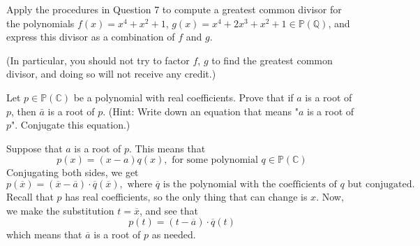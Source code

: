 \documentclass{article}
\theoremstyle{plain} %
\numberwithin{thm}{section} %
\theoremstyle{definition}
\begin{document}
    \newpage
    \begin{question}{8}
        Apply the procedures in Question 7 to compute a greatest common divisor for the polynomials
        \(f(x) = x^4 + x^2 + 1\), \(g(x) = x^4 + 2x^3 + x^2 + 1 \in \mathbb{P}(\mathbb{Q})\), and express this divisor as a combination
        of \(f\) and \(g\).

        (In particular, you should not try to factor \(f\), \(g\) to find the greatest common divisor, and doing
        so will not receive any credit.)
    \end{question}
    \newpage
    \begin{question}{9}
        Let $p \in \mathbb{P}(\mathbb{C})$ be a polynomial with real coefficients. Prove that if $a$ is a root of $p$, then $\bar{a}$ is a root of $p$. (Hint: Write down an equation that means "$a$ is a root of $p$". Conjugate this equation.)

        \tcblower

        Suppose that \(a\) is a root of \(p\). This means that
        \[
            p(x) = (x - a)q(x), \text{ for some polynomial } q \in \mathbb{P}(\mathbb{C})
        \]
        Conjugating both sides, we get
        \[
            p(\overline{x}) = (\overline{x} - \overline{a})\cdot \overline{q}(\overline{x}), \text{ where } \overline{q} \text{ is the polynomial with the coefficients of } q \text{ but conjugated.}
        \]
        Recall that \(p\) has real coefficients, so the only thing that can change is \(x\). Now, we make the substitution \(t = \overline{x}\), and see that
        \[
            p(t) = (t - \overline{a}) \cdot \overline{q}(t)
        \]
        which means that \(\overline{a}\) is a root of \(p\) as needed.
    \end{question}
    \newpage
\end{document}
